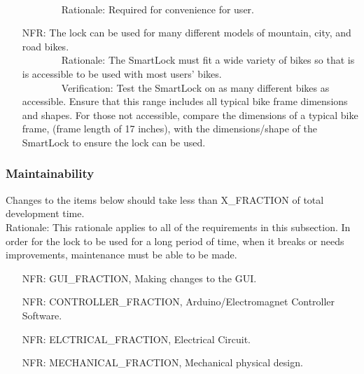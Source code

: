 \documentclass[12pt]{article}
\newcounter{nfrnum} %
\begin{document}
\begin{itemize}
\\ \-\ \-\ \-\ \-\ \-\ \-\ \-\ \-\ Rationale: Required for convenience for user. 
\item[NFR\refstepcounter{nfrnum}\thenfrnum\label{NFRModels}:] The lock can be used for many different models of mountain, city, and road bikes. 
\\ \-\ \-\ \-\ \-\ \-\ \-\ \-\ \-\ Rationale: The SmartLock must fit a wide variety of bikes so that is is accessible to be used with most users' bikes.
\\ \-\ \-\ \-\ \-\ \-\ \-\ \-\ \-\ Verification: Test the SmartLock on as many different bikes as accessible. Ensure that this range includes all typical bike frame dimensions and shapes. For those not accessible, compare the dimensions of a typical bike frame, (frame length of 17 inches), with the dimensions/shape of the SmartLock to ensure the lock can be used. 
\end{itemize}

\subsubsection{Maintainability}
Changes to the items below should take less than X\_FRACTION of total development time.
\\ Rationale: This rationale applies to all of the requirements in this subsection. In order for the lock to be used for a long period of time, when it breaks or needs improvements, maintenance must be able to be made. 
\begin{itemize}
\setlength{\itemindent}{.5in}
\item[NFR\refstepcounter{nfrnum}\thenfrnum\label{NFRGUI}:] GUI\_FRACTION, Making changes to the GUI.
\item[NFR\refstepcounter{nfrnum}\thenfrnum\label{NFRController}:] CONTROLLER\_FRACTION, Arduino/Electromagnet Controller Software.
\item[NFR\refstepcounter{nfrnum}\thenfrnum\label{NFRCircuit}:] ELCTRICAL\_FRACTION, Electrical Circuit.
\item[NFR\refstepcounter{nfrnum}\thenfrnum\label{NFRMech}:] MECHANICAL\_FRACTION, Mechanical physical design.
\end{itemize}
\end{document}
